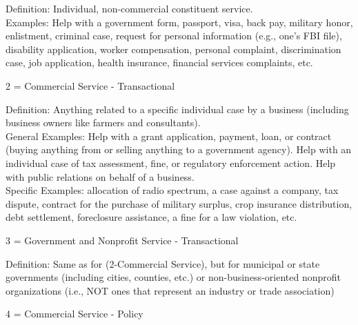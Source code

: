 \hfill\begin{minipage}{\dimexpr\textwidth-2cm}
Definition: Individual, non-commercial constituent service.\\
Examples: Help with a government form, passport, visa, back pay, military honor, enlistment, criminal case, request for personal information (e.g., one’s FBI file), disability application, worker compensation, personal complaint, discrimination case, job application, health insurance, financial services complaints, etc.\\
\end{minipage}

2 = Commercial Service - Transactional \\

\hfill\begin{minipage}{\dimexpr\textwidth-2cm}
Definition: Anything related to a specific individual case by a business (including business owners like farmers and consultants).\\ 
General Examples: Help with a grant application, payment, loan, or contract (buying anything from or selling anything to a government agency). Help with an individual case of tax assessment, fine, or regulatory enforcement action. Help with public relations on behalf of a business.\\
Specific Examples: allocation of radio spectrum, a case against a company, tax dispute, contract for the purchase of military surplus, crop insurance distribution, debt settlement, foreclosure assistance, a fine for a law violation, etc. \\
\end{minipage}

3 = Government and Nonprofit Service - Transactional\\

\hfill\begin{minipage}{\dimexpr\textwidth-2cm}
Definition: Same as for (2-Commercial Service), but for municipal or state governments (including cities, counties, etc.) or non-business-oriented nonprofit organizations (i.e., NOT ones that represent an industry or trade association) \\
\end{minipage}

4 = Commercial Service - Policy \\

